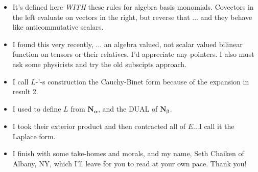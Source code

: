 \documentclass[14pt]{extarticle}
\begin{document}
{\begin{itemize}
\item
  It's defined here \emph{WITH} these rules for algebra basis monomials.  Covectors
  in the left evaluate on vectors in the right, but reverse that ... and
  they behave like anticommutative scalars.

\item
  I found this very recently, ... an algebra valued, not scalar valued bilinear
  function on tensors or their relatives.  I'd appreciate any pointers.
  I also must ask some physicists and try the old subscipts approach.

\item
I call $L$-'-s construction the Cauchy-Binet form because of the expansion in result 2.

\item
I used to define $L$ from $\mathbf{N_\alpha}$, and the DUAL of $\mathbf{N_\beta}$.

\item
I took their exterior product and then contracted all of $E$...I call it the
Laplace form.

\item
  I finish with some take-homes and morals, and my name, Seth Chaiken
  of Albany, NY, which
  I'll leave for you to read at your own pace.  Thank you!
  \end{itemize}
}
\end{document}
